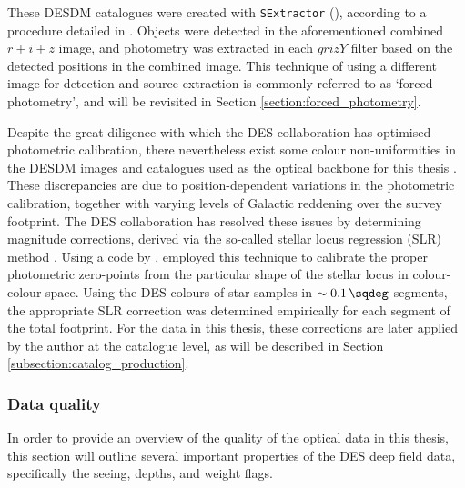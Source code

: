 These DESDM catalogues were created with \texttt{SExtractor} (\citealt{1996A&AS..117..393B}), according to a procedure detailed in  \cite{2018ApJS..235...33D}. Objects were detected in the aforementioned combined $r+i+z$ image, and photometry was extracted in each $grizY$ filter based on the detected positions in the combined image.  This technique of using a different image for detection and source extraction is commonly referred to as `forced photometry', and will be revisited in  Section \ref{section:forced_photometry}.  \par


Despite the great diligence with which the DES collaboration has optimised photometric calibration, there nevertheless exist some colour non-uniformities in the DESDM images and catalogues used as the optical backbone for this thesis \citep{2018ApJS..235...33D}. These discrepancies are due to position-dependent variations in the photometric calibration, together with varying levels of Galactic reddening over the survey footprint. The DES collaboration has resolved these issues by determining magnitude corrections, derived via the so-called  stellar locus regression (SLR) method \citep{2004AN....325..583I, 2009AJ....138..110H, 2012ApJ...757...83D, 2014MNRAS.439...28K}. Using a code by \cite{2014MNRAS.439...28K}, \cite{2018ApJS..235...33D} employed this technique to calibrate the proper photometric zero-points from the particular shape of the stellar locus in colour-colour space. Using the DES colours of star samples in $\sim\SI{0.1}{\sqdeg}$ segments, the appropriate SLR correction was determined empirically for each segment of the total footprint. For the data in this thesis, these corrections are later applied by the author at the catalogue level, as will be described in Section \ref{subsection:catalog_production}.  \par




\subsubsection{Data quality}\label{subsubsection:data_quality}
In order to provide an overview of the quality of the optical data in this thesis, this section will outline several important properties of the DES deep field data, specifically the seeing, depths, and weight flags. \par   




